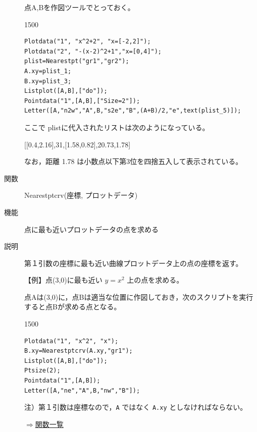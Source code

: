 \documentclass[papersize,a4paper,12pt,uplatex]{jsarticle}
\begin{document}
\begin{description}
点A,Bを作図ツールでとっておく。

\begin{layer}{150}{0}
\end{layer}

\begin{verbatim}
Plotdata("1", "x^2+2", "x=[-2,2]");
Plotdata("2", "-(x-2)^2+1","x=[0,4]");
plist=Nearestpt("gr1","gr2");
A.xy=plist_1;
B.xy=plist_3;
Listplot([A,B],["do"]);
Pointdata("1",[A,B],["Size=2"]);
Letter([A,"n2w","A",B,"s2e","B",(A+B)/2,"e",text(plist_5)]);
\end{verbatim}

ここで plistに代入されたリストは次のようになっている。

\hspace{10mm}[[0.4,2.16],31,[1.58,0.82],20.73,1.78] 

なお，距離 1.78 は小数点以下第3位を四捨五入して表示されている。

\vspace{\baselineskip}
\hypertarget{nearestptcrv}{}
\item[関数]Nearestptcrv(座標, プロットデータ)
\item[機能]点に最も近いプロットデータの点を求める
\item[説明]第１引数の座標に最も近い曲線プロットデータ上の点の座標を返す。

\vspace{\baselineskip}
【例】点(3,0)に最も近い $y=x^2$ 上の点を求める。

点Aは(3,0)に，点Bは適当な位置に作図しておき，次のスクリプトを実行すると点Bが求める点となる。

\begin{layer}{150}{0}
\end{layer}

\begin{verbatim}
Plotdata("1", "x^2", "x");
B.xy=Nearestptcrv(A.xy,"gr1");
Listplot([A,B],["do"]);
Ptsize(2);
Pointdata("1",[A,B]);
Letter([A,"ne","A",B,"nw","B"]);
\end{verbatim}

\vspace{\baselineskip}
\vspace{\baselineskip}
注）第１引数は座標なので，\verb|A| ではなく \verb|A.xy| としなければならない。

\begin{flushright}\hyperlink{functionlist}{$\Rightarrow$関数一覧}\end{flushright}


\end{description}
\end{document}
